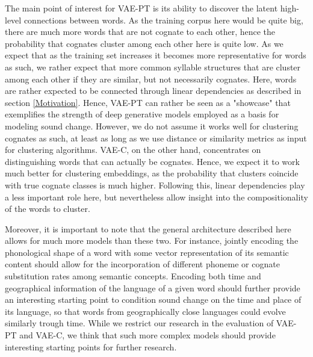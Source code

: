 \documentclass[6pt]{article}
\begin{document}
The main point of interest for VAE-PT is its ability to discover the latent high-level connections between words. As the training corpus here would be quite big, there are much more words that are not cognate to each other, hence the probability that cognates cluster among each other here is quite low. As we expect that as the training set increases it becomes more representative for words as such, we rather expect that more common syllable structures that are cluster among each other if they are similar, but not necessarily cognates. Here, words are rather expected to be connected through linear dependencies as described in section \ref{Motivation}. Hence, VAE-PT can rather be seen as a "showcase" that exemplifies the strength of deep generative models employed as a basis for modeling sound change. However, we do not assume it works well for clustering cognates as such, at least as long as we use distance or similarity metrics as input for clustering algorithms.
VAE-C, on the other hand, concentrates on distinguishing words that can actually be cognates. Hence, we expect it to work much better for clustering embeddings, as the probability that clusters coincide with true cognate classes is much higher. Following this, linear dependencies play a less important role here, but nevertheless allow insight into the compositionality of the words to cluster.

Moreover, it is important to note that the general architecture described here allows for much more models than these two. For instance, jointly encoding the phonological shape of a word with some vector representation of its semantic content should allow for the incorporation of different phoneme or cognate substitution rates among semantic concepts.  Encoding both time and geographical information of the language of a given word should further provide an interesting starting point to condition sound change on the time and place of its language, so that words from geographically close languages could evolve similarly trough time. While we restrict our research in the evaluation of VAE-PT and VAE-C, we think that such more complex models should provide interesting starting points for further research.
\end{document}
